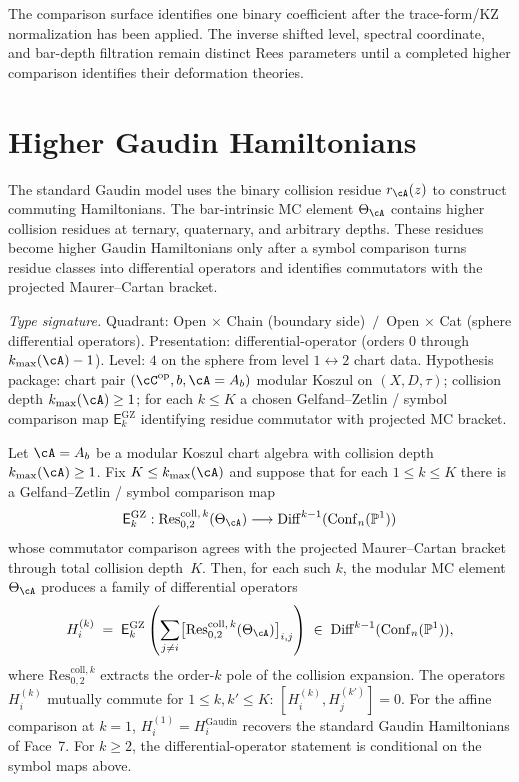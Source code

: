 The comparison surface identifies one binary coefficient after the
trace-form/KZ normalization has been applied. The inverse shifted
level, spectral coordinate, and bar-depth filtration remain distinct
Rees parameters until a completed higher comparison identifies their
deformation theories.

\section{Higher Gaudin Hamiltonians}
\label{sec:hdm-higher-gaudin}

The standard Gaudin model uses the binary collision residue
$r_\cA(z)$ to construct commuting Hamiltonians. The bar-intrinsic
MC element $\Theta_\cA$ contains higher collision residues at
ternary, quaternary, and arbitrary depths. These residues become higher
Gaudin Hamiltonians only after a symbol comparison turns residue
classes into differential operators and identifies commutators with the
projected Maurer--Cartan bracket.

\begin{theorem}
\label{thm:hdm-higher-gaudin}
\emph{Type signature.} Quadrant: Open $\times$ Chain (boundary side)
$\,/\,$ Open $\times$ Cat (sphere differential operators).
Presentation: differential-operator (orders $0$ through
$k_{\max}(\cA) - 1$). Level: $4$ on the sphere from level
$1\leftrightarrow 2$ chart data. Hypothesis package: chart pair
$(\cC^{\mathrm{op}}, b, \cA = A_b)$ modular Koszul on $(X, D, \tau)$;
collision depth $k_{\max}(\cA)\geq 1$; for each $k\leq K$ a chosen
Gelfand--Zetlin / symbol comparison map $\mathsf{E}^{\mathrm{GZ}}_k$
identifying residue commutator with projected MC bracket.

Let $\cA = A_b$ be a modular Koszul chart algebra with collision
depth $k_{\max}(\cA) \geq 1$. Fix $K\leq k_{\max}(\cA)$ and suppose
that for
each $1\leq k\leq K$ there is a Gelfand--Zetlin / symbol comparison map
\[
  \mathsf E^{\mathrm{GZ}}_k:
  \mathrm{Res}^{\mathrm{coll},\,k}_{0,2}(\Theta_\cA)
  \longrightarrow
  \mathrm{Diff}^{k-1}(\mathrm{Conf}_n(\mathbb P^1))
\]
whose commutator comparison agrees with the projected
Maurer--Cartan bracket through total collision depth~$K$. Then, for
each such $k$, the modular MC element $\Theta_\cA$ produces a family of
differential operators
\begin{equation}\label{eq:hdm-higher-gaudin}
H_i^{(k)}
\;=\;
\mathsf E^{\mathrm{GZ}}_k
\left(
  \sum_{j \neq i}
  \bigl[\mathrm{Res}^{\mathrm{coll},\,k}_{0,2}(\Theta_\cA)\bigr]_{i,j}
\right)
\;\in\;
\mathrm{Diff}^{k-1}(\mathrm{Conf}_n(\mathbb{P}^1)),
\end{equation}
where $\mathrm{Res}^{\mathrm{coll},k}_{0,2}$ extracts the order-$k$
pole of the collision expansion. The operators $H_i^{(k)}$
mutually commute for $1\leq k,k'\leq K$:
$[H_i^{(k)}, H_j^{(k')}] = 0$. For the affine comparison at $k=1$,
$H_i^{(1)} = H_i^{\mathrm{Gaudin}}$ recovers the standard Gaudin
Hamiltonians of Face~7. For $k \geq 2$, the differential-operator
statement is conditional on the symbol maps above.
\end{theorem}

